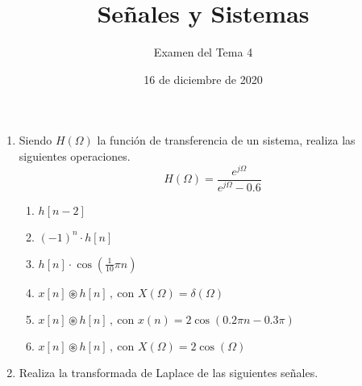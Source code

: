 \documentclass{article}
\title{Señales y Sistemas}
\author{Examen del Tema 4}
\date{16 de diciembre de 2020}
\begin{document}
\maketitle

\begin{enumerate}

	\item Siendo $H(\Omega)$ la función de transferencia de un sistema, realiza las siguientes operaciones.
	      \[H(\Omega)=\frac{e^{j\Omega}}{e^{j\Omega}-0.6}\]
	      \begin{enumerate}
		      \item $\displaystyle{h[n-2]}$
		      \item $\displaystyle{(-1)^n\cdot h[n]}$
		      \item $\displaystyle{h[n]\cdot \cos \left( \frac{1}{10} \pi n \right)}$
		      \item $\displaystyle{x[n]\circledast h[n]\, , \ \text{con }X(\Omega) = \delta (\Omega)}$
		      \item $\displaystyle{x[n]\circledast h[n]\, , \ \text{con }x(n) = 2\cos \left( 0.2 \pi n -0.3 \pi \right)}$
		      \item $\displaystyle{x[n]\circledast h[n]\, , \ \text{con }X(\Omega) = 2\cos \left( \Omega \right)}$
	      \end{enumerate}



	\item Realiza la transformada de Laplace de las siguientes señales.

\end{enumerate}
\end{document}
